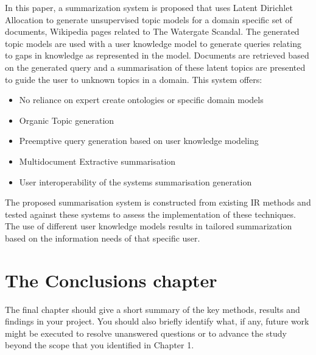 In this paper, a summarization system is proposed that uses Latent Dirichlet Allocation to generate unsupervised topic models for a domain specific set of documents, Wikipedia pages related to The Watergate Scandal. The generated topic models are used with a user knowledge model to generate queries relating to gaps in knowledge as represented in the model. Documents are retrieved based on the generated query and a summarisation of these latent topics are presented to guide the user to unknown topics in a domain. This system offers:

\begin{itemize}
    \item No reliance on expert create ontologies or specific domain models
    \item Organic Topic generation
    \item Preemptive query generation based on user knowledge modeling
    \item Multidocument Extractive summarisation
    \item User interoperability of the systems summarisation generation    
\end{itemize}

The proposed summarisation system is constructed from existing IR methods and tested against these systems to assess the implementation of these techniques. The use of different user knowledge models results in tailored summarization based on the information needs of that specific user.

\section{The Conclusions chapter}
The final chapter should give a short summary of the key methods, results and findings in your project. You should also briefly identify what, if any, future work might be executed to resolve unanswered questions or to advance the study beyond the scope that you identified in Chapter 1.
